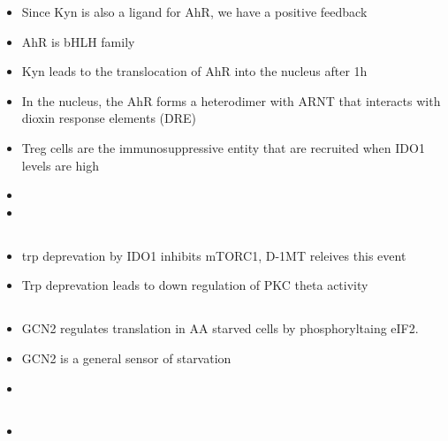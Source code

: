 \documentclass{article}
\begin{document}
\begin{itemize}
        \item Since Kyn is also a ligand for AhR, we have a positive feedback \cite{opitz2011endogenous}
        \item AhR is bHLH family
        \item Kyn leads to the translocation of AhR into the nucleus after 1h \cite{opitz2011endogenous}
        \item In the nucleus, the AhR forms a heterodimer with ARNT that interacts with dioxin response elements (DRE) \cite{opitz2011endogenous}
        \item Treg cells are the immunosuppressive entity that are recruited when IDO1 levels are high
        \item
        \item
    \end{itemize}

    \subsection{\cite{metz2012ido}}
    \begin{itemize}
        \item trp deprevation by IDO1 inhibits mTORC1, D-1MT releives this event
        \item Trp deprevation leads to down regulation of PKC theta activity
    \end{itemize}




    \subsection{\cite{dong2000uncharged}}
    \begin{itemize}
        \item GCN2 regulates translation in AA starved cells by phosphoryltaing eIF2.
        \item GCN2 is a general sensor of starvation
        \item
    \end{itemize}

    \subsection{\cite{hao2005uncharged}}
    \begin{itemize}
        \item
    \end{itemize}
\end{document}
